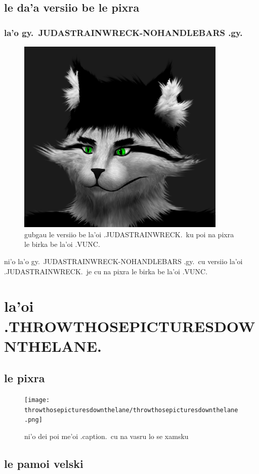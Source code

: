 \documentclass{report}
\begin{document}
\section{le da'a versiio be le pixra}

\subsection{la'o gy.\ JUDASTRAINWRECK-NOHANDLEBARS .gy.}
\begin{figure}[ht]
	\centering
	\includegraphics[width=10cm]{judastrainwreck/judastrainwreck-nohandlebars.png}
	\caption[center]{gubgau le versiio be la'oi .JUDASTRAINWRECK.\ ku poi na pixra le birka be la'oi .VUNC.}
\end{figure}
ni'o la'o gy.\ JUDASTRAINWRECK-NOHANDLEBARS .gy.\ cu versiio la'oi .JUDASTRAINWRECK.\ je cu na pixra le birka be la'oi .VUNC.

\chapter{la'oi .THROWTHOSEPICTURESDOWNTHELANE.}
\section{le pixra}
\begin{figure}[ht]
	\centering
	\texttt{[image: throwthosepicturesdownthelane/throwthosepicturesdownthelane.png]}
	\caption[center]{ni'o dei poi me'oi .caption.\ cu na vasru lo se xamsku}
\end{figure}
\section{le pamoi velski}
\end{document}
